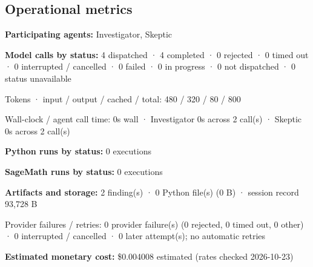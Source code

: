\documentclass[11pt]{article}
\begin{document}
\subsection{Operational metrics}
\textbf{Participating agents:} Investigator, Skeptic\par
\textbf{Model calls by status:} 4 dispatched · 4 completed · 0 rejected · 0 timed out · 0 interrupted / cancelled · 0 failed · 0 in progress · 0 not dispatched · 0 status unavailable\par
Tokens · input / output / cached / total: 480 / 320 / 80 / 800\par
Wall-clock / agent call time: 0s wall · Investigator 0s across 2 call(s) · Skeptic 0s across 2 call(s)\par
\textbf{Python runs by status:} 0 executions\par
\textbf{SageMath runs by status:} 0 executions\par
\textbf{Artifacts and storage:} 2 finding(s) · 0 Python file(s) (0 B) · session record 93,728 B\par
Provider failures / retries: 0 provider failure(s) (0 rejected, 0 timed out, 0 other) · 0 interrupted / cancelled · 0 later attempt(s); no automatic retries\par
\textbf{Estimated monetary cost:} \$0.004008 estimated (rates checked 2026-10-23)\par
\end{document}
